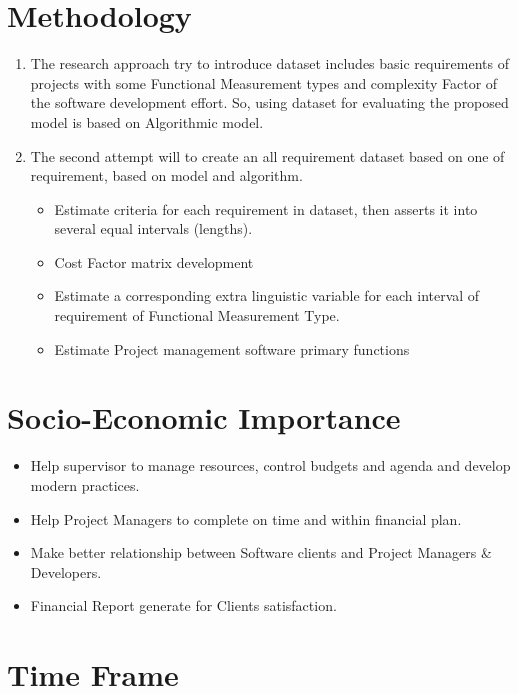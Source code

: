 \section{Methodology}

\begin{enumerate}
  \item The research approach try to introduce dataset includes basic requirements of projects with some Functional Measurement types and complexity Factor of the software development effort. So, using dataset for evaluating the proposed model is based on Algorithmic model.
  \item The second attempt will to create an all requirement dataset based on one of requirement, based on model and algorithm.
  \begin{itemize}
    \item Estimate criteria for each requirement in dataset, then asserts it into several equal intervals (lengths).
    \item Cost Factor matrix development
    \item Estimate a corresponding extra linguistic variable for each interval of requirement of Functional Measurement Type.
    \item Estimate Project management software primary functions
  \end{itemize}
\end{enumerate}

\section{Socio-Economic Importance}

\begin{itemize}
  \item Help supervisor to manage resources, control budgets and agenda and develop modern practices.
  \item Help Project Managers to complete on time and within financial plan.
  \item Make better relationship between Software clients and Project Managers \& Developers.
  \item Financial Report generate for Clients satisfaction.
\end{itemize}


\section{Time Frame}

